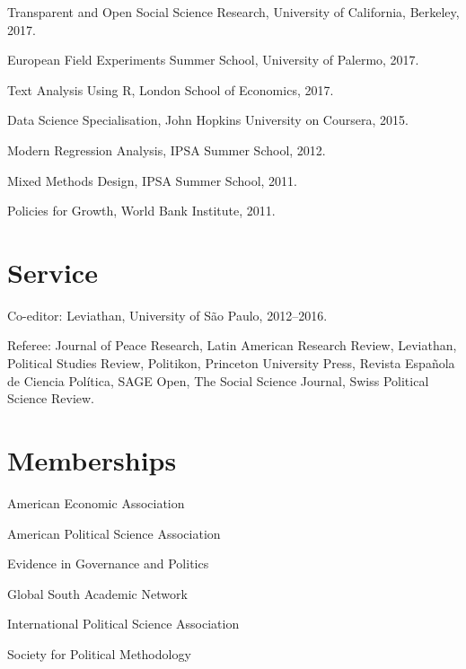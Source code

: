 \documentclass[a4paper]{article}
\renewenvironment{itemize}{
	\begin{list}{}{
			\setlength{\leftmargin}{1.5em}
		}
		}{
	\end{list}
}
\begin{document}
\begin{itemize}
\item Transparent and Open Social Science Research, University of California, Berkeley, 2017. %
\item European Field Experiments Summer School, University of Palermo, 2017.
\item Text Analysis Using R, London School of Economics, 2017.
\item Data Science Specialisation, John Hopkins University on Coursera, 2015.
\item Modern Regression Analysis, IPSA Summer School, 2012.
\item Mixed Methods Design, IPSA Summer School, 2011.
\item Policies for Growth, World Bank Institute, 2011.
\end{itemize}

\section*{Service}

\begin{itemize}
\item Co-editor: Leviathan, University of São Paulo, 2012--2016.
\item Referee: Journal of Peace Research, Latin American Research Review, Leviathan, Political Studies Review, Politikon, Princeton University Press, Revista Española de Ciencia Política, SAGE Open, The Social Science Journal, Swiss Political Science Review.
\end{itemize} 

\section*{Memberships}

\begin{itemize}
\item American Economic Association
\item American Political Science Association
\item Evidence in Governance and Politics
\item Global South Academic Network
\item International Political Science Association
\item Society for Political Methodology
\end{itemize}
\end{document}
